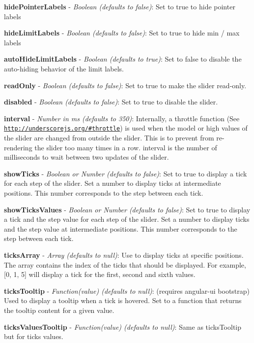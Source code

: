 {\bfseries hide\+Pointer\+Labels} -\/ {\itshape Boolean (defaults to false)}\+: Set to true to hide pointer labels

{\bfseries hide\+Limit\+Labels} -\/ {\itshape Boolean (defaults to false)}\+: Set to true to hide min / max labels

{\bfseries auto\+Hide\+Limit\+Labels} -\/ {\itshape Boolean (defaults to true)}\+: Set to false to disable the auto-\/hiding behavior of the limit labels.

{\bfseries read\+Only} -\/ {\itshape Boolean (defaults to false)}\+: Set to true to make the slider read-\/only.

{\bfseries disabled} -\/ {\itshape Boolean (defaults to false)}\+: Set to true to disable the slider.

{\bfseries interval} -\/ {\itshape Number in ms (defaults to 350)}\+: Internally, a {\ttfamily throttle} function (See \href{http://underscorejs.org/#throttle}{\tt http\+://underscorejs.\+org/\#throttle}) is used when the model or high values of the slider are changed from outside the slider. This is to prevent from re-\/rendering the slider too many times in a row. {\ttfamily interval} is the number of milliseconds to wait between two updates of the slider.

{\bfseries show\+Ticks} -\/ {\itshape Boolean or Number (defaults to false)}\+: Set to true to display a tick for each step of the slider. Set a number to display ticks at intermediate positions. This number corresponds to the step between each tick.

{\bfseries show\+Ticks\+Values} -\/ {\itshape Boolean or Number (defaults to false)}\+: Set to true to display a tick and the step value for each step of the slider. Set a number to display ticks and the step value at intermediate positions. This number corresponds to the step between each tick.

{\bfseries ticks\+Array} -\/ {\itshape Array (defaults to null)}\+: Use to display ticks at specific positions. The array contains the index of the ticks that should be displayed. For example, \mbox{[}0, 1, 5\mbox{]} will display a tick for the first, second and sixth values.

{\bfseries ticks\+Tooltip} -\/ {\itshape Function(value) (defaults to null)}\+: (requires angular-\/ui bootstrap) Used to display a tooltip when a tick is hovered. Set to a function that returns the tooltip content for a given value.

{\bfseries ticks\+Values\+Tooltip} -\/ {\itshape Function(value) (defaults to null)}\+: Same as {\ttfamily ticks\+Tooltip} but for ticks values.

